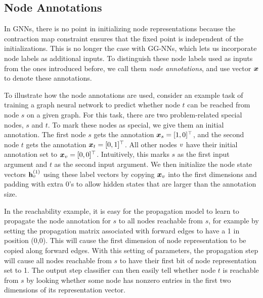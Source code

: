 \documentclass{article} %
\newcommand{\OurMethodMinorShort}{GG-NN}
\newcommand{\OurMethodMinorShorts}{\OurMethodMinorShort s}
\begin{document}
\subsection{Node Annotations}

In GNNs,
there is no point in initializing node representations because the
contraction map constraint ensures that the fixed point is independent
of the initializations. This is no longer the case with \OurMethodMinorShorts,
which lets us incorporate node labels as additional inputs. To distinguish
these node labels used as inputs from the ones introduced before, we call them
\emph{node annotations}, and use vector $\boldsymbol{x}$ to denote these
annotations. %


To illustrate how the node annotations are used, consider an example task of
training a graph neural network to predict whether
node $t$ can be reached from node $s$ on a given graph.  For this task,
there are two problem-related special nodes, $s$ and $t$. To mark these nodes
as special, we give them an initial annotation. The first node $s$ gets the
annotation $\boldsymbol{x}_s=[1,0]^\top$, and the second node $t$ gets the annotation
$\boldsymbol{x}_t=[0,1]^\top$. All other nodes $v$ have their initial annotation set to
$\boldsymbol{x}_v=[0,0]^\top$. Intuitively, this marks $s$ as the first input argument and $t$ as the second input argument.
We then initialize the node state vectors $\mathbf{h}_{v}^{(1)}$ using these label vectors
by copying $\boldsymbol{x}_v$ into the first dimensions and padding with extra 0's to allow hidden states that are larger than the annotation size.

In the reachability example, it is easy for the propagation model to learn to propagate the node annotation
for $s$ to all nodes reachable from $s$, for example by setting the propagation matrix associated with forward edges to have a 1 in position (0,0). This will cause the first dimension of node representation to be copied along forward edges.
With this setting of parameters, the propagation step will cause all nodes
reachable from $s$ to have their first bit of node representation set to 1.
The output step classifier can then easily tell whether node $t$ is reachable from $s$ by looking whether some node has nonzero entries in the first two dimensions of its representation vector.

\end{document}
